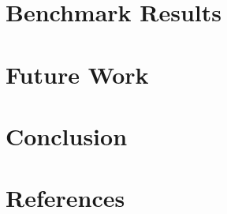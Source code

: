 \documentclass[10pt]{sig-alternate}
\begin{document}
\section{Benchmark Results}

\section{Future Work}


\section{Conclusion}

\section{References}
\end{document}
